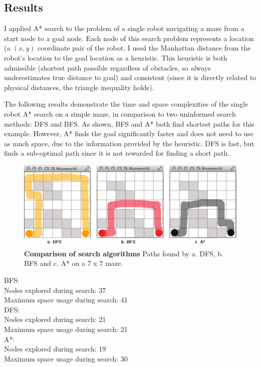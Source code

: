 \documentclass{article}
\begin{document}
\subsection{Results}

I applied A* search to the problem of a single robot navigating a maze from a start node to a goal node. Each node of this search problem represents a location (a $(x, y)$ coordinate pair of the robot. I used the Manhattan distance from the robot's location to the goal location as a heuristic. This heuristic is both admissible (shortest path possible regardless of obstacles, so always underestimates true distance to goal) and consistent (since it is directly related to physical distances, the triangle inequality holds).

The following results demonstrate the time and space complexities of the single robot A* search on a simple maze, in comparison to two uninformed search methods: DFS and BFS. As shown, BFS and A* both find shortest paths for this example. However, A* finds the goal significantly faster and does not need to use as much space, due to the information provided by the heuristic. DFS is fast, but finds a sub-optimal path since it is not rewarded for finding a short path.

\begin{figure}[!htb]
\centering
\includegraphics[scale=.55]{onerobot.pdf}
\caption{{\bf Comparison of search algorithms} Paths found by a. DFS, b. BFS and c. A* on a 7 x 7 maze.}
\end{figure}

\vspace{5mm}

{\setlength{\parindent}{0cm}
BFS:  \\
  Nodes explored during search: 37\\
  Maximum space usage during search: 41\\
DFS:  \\
  Nodes explored during search: 21\\
  Maximum space usage during search: 21\\
A*:  \\
  Nodes explored during search: 19\\
  Maximum space usage during search: 30\\
}
  
\end{document}
